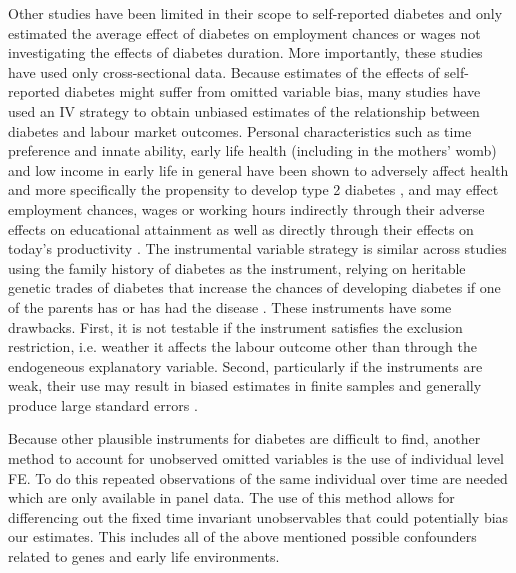 Other studies have been limited in their scope to self-reported diabetes
and only estimated the average effect of diabetes on employment chances
or wages not investigating the effects of diabetes duration. More importantly,
these studies have used only cross-sectional data. Because estimates of the effects of self-reported
diabetes might suffer from omitted variable bias, many studies have
used an \ac{IV} strategy to obtain unbiased estimates of the relationship
between diabetes and labour market outcomes. Personal characteristics such as time preference
and innate ability, early life health (including
in the mothers' womb) and low income in early life in general have been shown to
adversely affect health and more specifically the propensity to develop
type 2 diabetes \citep{VanEwijk2011a,Sotomayor2013,Li2010b}, and
may effect employment chances, wages or working hours indirectly
through their adverse effects on educational attainment \citep{Ayyagari2011b}
as well as directly through their effects on today's productivity
\citep{Currie2013}. The instrumental variable strategy is similar across studies using the family
history of diabetes as the instrument, relying on heritable genetic
trades of diabetes that increase the chances of developing diabetes
if one of the parents has or has had the disease \citep{Brown2005,Latif2009,Minor2010a,Lin2011b,Seuring2015}.
These instruments have some drawbacks. First, it
is not testable if the instrument satisfies the exclusion restriction, i.e. weather it affects the labour outcome other than through the endogeneous explanatory variable. Second, particularly if the instruments are weak, their use may result in biased estimates in finite samples and generally produce
large standard errors \citep{Bound1995}. 

Because other plausible instruments for diabetes are difficult to
find, another method to account for unobserved omitted variables is
the use of individual level \ac{FE}. To do this repeated observations
of the same individual over time are needed which are only available
in panel data. The use of this method allows for differencing out
the fixed time invariant unobservables that could potentially bias
our estimates. This includes all of the above mentioned possible confounders
related to genes and early life environments.

